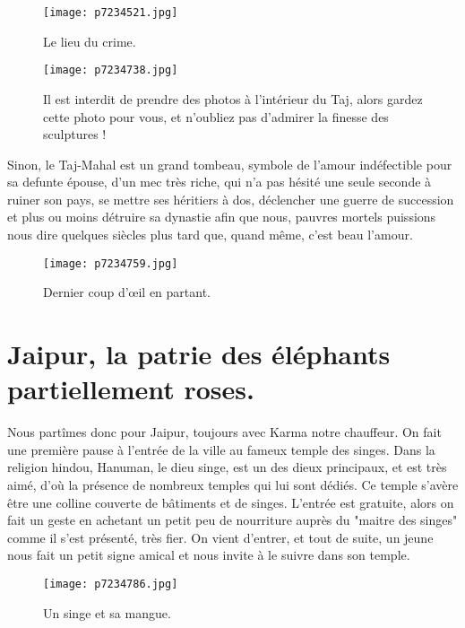 \documentclass{book}
\begin{document}
\begin{figure}[h]
\centering
\texttt{[image: p7234521.jpg]}
\caption*{Le lieu du crime.}
\end{figure}


\begin{figure}[h]
\centering
\texttt{[image: p7234738.jpg]}
\caption*{Il est interdit de prendre des photos à l'intérieur du Taj, alors gardez cette photo pour vous, et n'oubliez pas d'admirer la finesse des sculptures !}
\end{figure}

Sinon, le Taj-Mahal est un grand tombeau, symbole de l'amour indéfectible pour sa defunte épouse, d'un mec très riche, qui n'a pas hésité une seule seconde à ruiner son pays, se mettre ses héritiers à dos, déclencher une guerre de succession et plus ou moins détruire sa dynastie afin que nous, pauvres mortels puissions nous dire quelques siècles plus tard que, quand même, c'est beau l'amour.


\begin{figure}[h]
\centering
\texttt{[image: p7234759.jpg]}
\caption*{Dernier coup d’œil en partant.}
\end{figure}





\chapter{Jaipur, la patrie des éléphants partiellement roses.}
Nous partîmes donc pour Jaipur, toujours avec Karma notre chauffeur. On fait une première pause à l'entrée de la ville au fameux temple des singes. Dans la religion hindou, Hanuman, le dieu singe, est un des dieux principaux, et est très aimé, d'où la présence de nombreux temples qui lui sont dédiés. Ce temple s'avère être une colline couverte de bâtiments et de singes. L'entrée est gratuite, alors on fait un geste en achetant un petit peu de nourriture auprès du "maitre des singes" comme il s'est présenté, très fier. On vient d'entrer, et tout de suite, un jeune nous fait un petit signe amical et nous invite à le suivre dans son temple.


\begin{figure}[h]
\centering
\texttt{[image: p7234786.jpg]}
\caption*{Un singe et sa mangue.}
\end{figure}
\end{document}
